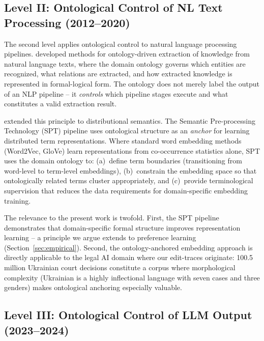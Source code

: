 \documentclass[11pt]{article}
\begin{document}
\subsection{Level II: Ontological Control of NL Text Processing (2012--2020)}
\label{sec:level2}

The second level applies ontological control to natural language processing pipelines.
\citet{palagin2012knowledge} developed methods for ontology-driven extraction of knowledge from natural language texts, where the domain ontology governs which entities are recognized, what relations are extracted, and how extracted knowledge is represented in formal-logical form.
The ontology does not merely label the output of an NLP pipeline -- it \emph{controls} which pipeline stages execute and what constitutes a valid extraction result.

\citet{palagin2020distributional} extended this principle to distributional semantics.
The Semantic Pre-processing Technology (SPT) pipeline uses ontological structure as an \emph{anchor} for learning distributed term representations.
Where standard word embedding methods (Word2Vec, GloVe) learn representations from co-occurrence statistics alone, SPT uses the domain ontology to:
(a)~define term boundaries (transitioning from word-level to term-level embeddings),
(b)~constrain the embedding space so that ontologically related terms cluster appropriately, and
(c)~provide terminological supervision that reduces the data requirements for domain-specific embedding training.

The relevance to the present work is twofold.
First, the SPT pipeline demonstrates that domain-specific formal structure improves representation learning -- a principle we argue extends to preference learning (Section~\ref{sec:empirical}).
Second, the ontology-anchored embedding approach is directly applicable to the legal AI domain where our edit-traces originate: 100.5 million Ukrainian court decisions constitute a corpus where morphological complexity (Ukrainian is a highly inflectional language with seven cases and three genders) makes ontological anchoring especially valuable.

\subsection{Level III: Ontological Control of LLM Output (2023--2024)}
\label{sec:level3}
\end{document}
